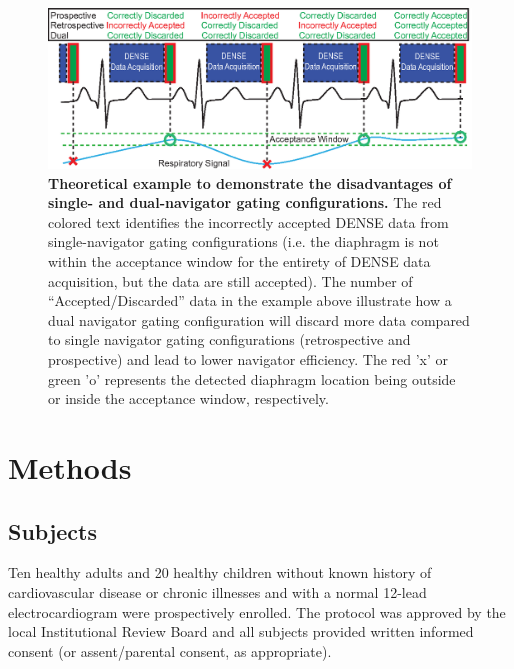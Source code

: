 	\begin{figure} 
		\includegraphics{figures/navpaper/Fig2}
		\caption[Theoretical example to demonstrate the disadvantages of single- and dual-navigator gating configurations]{\textbf{Theoretical example to demonstrate the disadvantages of single- and dual-navigator gating configurations.} The red colored text identifies the incorrectly accepted DENSE data from single-navigator gating configurations (i.e. the diaphragm is not within the acceptance window for the entirety of DENSE data acquisition, but the data are still accepted). The number of “Accepted/Discarded” data in the example above illustrate how a dual navigator gating configuration will discard more data compared to single navigator gating configurations (retrospective and prospective) and lead to lower navigator efficiency. The red 'x' or green 'o' represents the detected diaphragm location being outside or inside the acceptance window, respectively.}
		\label{fig:navigator_advantages_disadvantages}
	\end{figure}

\section{Methods}

\subsection{Subjects}
	Ten healthy adults and 20 healthy children without known history of cardiovascular disease or chronic illnesses and with a normal 12-lead electrocardiogram were prospectively enrolled. The protocol was approved by the local Institutional Review Board and all subjects provided written informed consent (or assent/parental consent, as appropriate).

